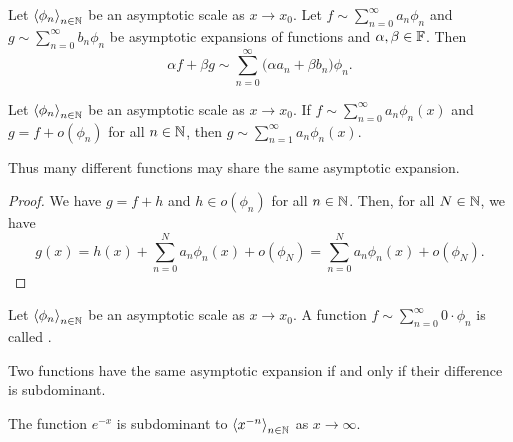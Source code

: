 \begin{lemma}
Let $\left\langle \phi_n \right\rangle_{n\in \mathbb{N}}$ be an asymptotic scale as $x\to x_0$. Let $f \sim \sum_{n=0}^\infty a_n\phi_n$ and $g \sim \sum_{n=0}^\infty b_n\phi_n$ be asymptotic expansions of functions and $\alpha,\beta\in \mathbb{F}$. Then
\[ \alpha f+\beta g \sim \sum_{n=0}^\infty \big(\alpha a_n + \beta b_n\big)\phi_n. \]
\end{lemma}


\begin{lemma}
Let $\left\langle \phi_n \right\rangle_{n\in \mathbb{N}}$ be an asymptotic scale as $x\to x_0$. If $f \sim \sum_{n = 0}^\infty a_n\phi_n(x)$ and $g = f+o(\phi_n)$ for all $n\in \mathbb{N}$, then $g \sim \sum_{n = 1}^\infty a_n\phi_n(x)$.
\end{lemma}
Thus many different functions may share the same asymptotic expansion.
\begin{proof}
We have $g = f+ h$ and $h\in o(\phi_n)$ for all $n\in \mathbb{N}$. Then, for all $N\in \mathbb{N}$, we have 
\[ g(x) = h(x) + \sum_{n=0}^N a_n\phi_n(x) + o(\phi_{N}) = \sum_{n=0}^N a_n\phi_n(x) + o(\phi_{N}). \]
\end{proof}


\begin{definition}
Let $\left\langle \phi_n \right\rangle_{n\in \mathbb{N}}$ be an asymptotic scale as $x\to x_0$. A function $f \sim \sum_{n=0}^\infty 0\cdot \phi_n$ is called .
\end{definition}
Two functions have the same asymptotic expansion if and only if their difference is subdominant.

\begin{example}
The function $e^{-x}$ is subdominant to $\left\langle x^{-n} \right\rangle_{n\in \mathbb{N}}$ as $x\to \infty$.
\end{example}

